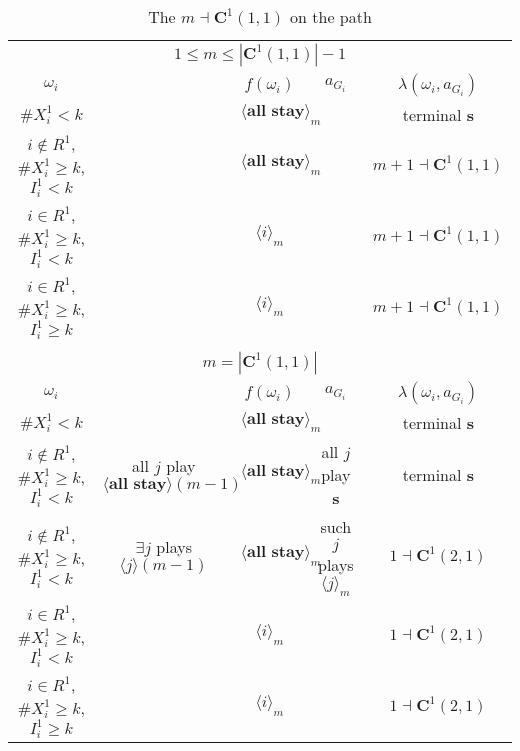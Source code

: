 \documentclass[12pt,letter]{article}
\newcommand{\Kappa}{\mathbf{C}}
\theoremstyle{definition}
\theoremstyle{remark}
\theoremstyle{claim}
\begin{document}
\begin{landscape}
\begin{table}[!htbp]
\caption{The $m\dashv\Kappa^1(1,1)$ on the path}
\label{table:eqm_path_k01}
\begin{center}
\begin{tabular}{c c | c | c | c }
\multicolumn{5}{c}{$1\leq m \leq |\Kappa^1(1,1)|-1$}\\
$\omega_i$ 	 & 	   &	$f(\omega_i)$  &	$a_{G_i}$ & $\lambda(\omega_i,a_{G_i})$ \\
\hline
\hline
$\# X^1_i<k$  	& 	 &$\langle \textbf{all stay} \rangle_m$ &	& terminal \textbf{s}\\
$i\notin R^1$, $\# X^1_i\geq k$, $I^1_i< k$  	&  &$\langle \textbf{all stay} \rangle_m$ & 	& $m+1\dashv\Kappa^1(1,1)$\\
$i\in R^1$, $\# X^1_i\geq k$, $I^1_i< k$  	& 	 &$\langle i \rangle_m$	&  & $m+1\dashv \Kappa^1(1,1)$\\
$i\in R^1$, $\# X^1_i\geq k$, $I^1_i\geq k$  	& 	 &$\langle i \rangle_m$	&  & $m+1\dashv \Kappa^1(1,1)$\\
\hline
\\
\multicolumn{5}{c}{$m=|\Kappa^1(1,1)|$}\\
$\omega_i$ 	 & 	   &	$f(\omega_i)$  &	$a_{G_i}$ & $\lambda(\omega_i,a_{G_i})$ \\
\hline
\hline
$\# X^1_i<k$  	& 	& $\langle \textbf{all stay} \rangle_m$	&     & terminal \textbf{s}\\
$i\notin R^1$, $\# X^1_i\geq k$, $I^1_i< k$   	& all $j$ play $\langle \textbf{all stay} \rangle(m-1)$ & $\langle \textbf{all stay} \rangle_m$	 & all $j$ play \textbf{s} & terminal \textbf{s}\\
$i\notin R^1$, $\# X^1_i\geq k$, $I^1_i< k$   	& $\exists j$ plays $\langle j \rangle(m-1)$ & $\langle \textbf{all stay} \rangle_m$	& such $j$ plays $\langle j \rangle_m$  & $1\dashv \Kappa^1(2,1)$\\
$i\in R^1$, $\# X^1_i\geq k$, $I^1_i< k$   	& 	& $\langle i \rangle_m$	&& $1\dashv \Kappa^1(2,1)$ \\
$i\in R^1$, $\# X^1_i\geq k$, $I^1_i\geq k$  	& 	& $\langle i \rangle_m$ &	& $1\dashv \Kappa^1(2,1)$ \\
\hline
\end{tabular}
\end{center}
\end{table}



\end{landscape}
\end{document}
